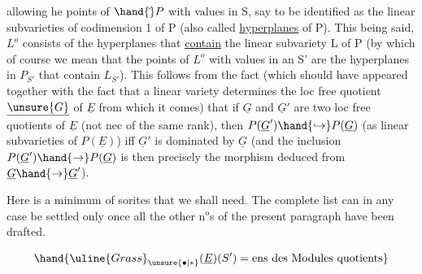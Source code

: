  

allowing he points of $\hand{\check{}}P$\hand{,} with values in  S, say\hand{,}
to be identified as the linear subvarieties of codimension 1 of P (also called
\uline{hyperplanes} of P). This being said, $L^{o}$ consists of the hyperplanes that
\uline{contain} the linear subvariety L of P (by which of course we
mean that the points of $L^{o}$  with values in an S' are the
hyperplanes in $P_{S'}$ that contain $L_{S'}$). This follows from the fact 
(which should have appeared together with the fact that a linear variety \hand{,}
determines the loc free quotient $\underline{\unsure{G}}$ of $\underline{E}$ from which it comes) that if
$\underline{G}$ and $\underline{G}'$ are two loc free quotients of $\underline{E}$ (not nec of the same rank),
then $P(\underline{G}')\hand{\hookrightarrow}P(\underline{G})$ (as linear subvarieties of $P(\underline{E})$) iff
$\underline{G}'$ is dominated by $\underline{G}$ (and the inclusion $P(\underline{G}')\hand{\rightarrow}P(\underline{G})$ is then precisely
the morphism deduced from $\underline{G}\hand{\rightarrow}\underline{G}'$).

Here is a minimum of sorites that we shall need. The complete
list can in any case be settled only once all
the other n$^{\text{o}}$s of the present paragraph have been drafted.


\[ \hand{\uline{Grass}_{\unsure{\bullet|*}}(\underline{E})(S') = \text{ens des Modules quotients}} \]

